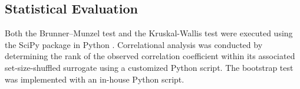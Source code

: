 \subsection{Statistical Evaluation}
Both the Brunner--Munzel test and the Kruskal-Wallis test were executed using the SciPy package in Python \cite{virtanen_scipy_2020}. Correlational analysis was conducted by determining the rank of the observed correlation coefficient within its associated set-size-shuffled surrogate using a customized Python script. The bootstrap test was implemented with an in-house Python script.
\label{sec:methods}
